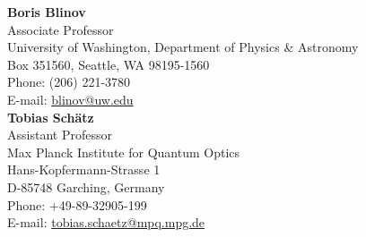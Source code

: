 \documentclass[letter]{article}
\begin{document}
{\bf Boris Blinov}\\
Associate Professor\\
University of Washington, Department of Physics \& Astronomy\\
Box 351560, Seattle, WA 98195-1560\\
Phone: (206) 221-3780\\
E-mail: \url{blinov@uw.edu}\\

{\bf Tobias Sch\"atz}\\
Assistant Professor\\
Max Planck Institute for Quantum Optics\\
Hans-Kopfermann-Strasse 1\\
D-85748 Garching, Germany\\
Phone: +49-89-32905-199\\
E-mail: \url{tobias.schaetz@mpq.mpg.de}\\



\end{document}
